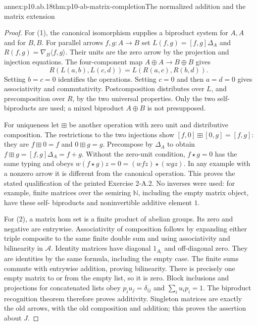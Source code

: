 \begin{annexitem}{annex:p10.ab.18}{thm:p10-ab-matrix-completion}{The normalized addition and the matrix extension}
\begin{proof}
For (1), the canonical isomorphism supplies a biproduct system for
\(A,A\) and for \(B,B\). For parallel arrows \(f,g:A\to B\)
set \(L(f,g)=[f,g]\Delta_A\) and
\(R(f,g)=\nabla_B\langle f,g\rangle\). Their units are the zero
arrow by the projection and injection equations. The four-component
map \(A\oplus A\to B\oplus B\) gives
\[
 R(L(a,b),L(c,d))=L(R(a,c),R(b,d)).
\]
Setting \(b=c=0\) identifies the operations. Setting \(c=0\)
and then \(a=d=0\) gives associativity and commutativity.
Postcomposition distributes over \(L\), and precomposition over
\(R\), by the two universal properties. Only the two self-biproducts
are used; a mixed biproduct \(A\oplus B\) is not presupposed.

For uniqueness let \(\boxplus\) be another operation with zero unit
and distributive composition. The restrictions to the two injections
show
\([f,0]\boxplus[0,g]=[f,g]\): they are \(f\boxplus0=f\)
and \(0\boxplus g=g\). Precompose by \(\Delta_A\) to obtain
\(f\boxplus g=[f,g]\Delta_A=f+g\). Without the zero-unit
condition, \(f\star g=0\) has the same typing and obeys
\(w(f\star g)z=0=(wfz)\star(wgz)\). In any example with a
nonzero arrow it is different from the canonical operation. This proves
the stated qualification of the printed Exercise 2-A.2.
No inverses were used: for example, finite matrices over the semiring
\(\mathbb N\), including the empty matrix object, have these self-
biproducts and noninvertible additive element \(1\).

For (2), a matrix hom set is a finite product of abelian groups.
Its zero and negative are entrywise. Associativity of composition
follows by expanding either triple composite to the same finite double
sum and using associativity and bilinearity in \(\mathcal A\).
Identity matrices have diagonal \(1_{A_i}\) and off-diagonal zero.
They are identities by the same formula, including the empty case.
The finite sums commute with entrywise addition, proving bilinearity.
There is precisely one empty matrix to or from the empty list, so it
is zero. Block inclusions and projections for concatenated lists obey
\(p_i u_j=\delta_{ij}\) and \(\sum_i u_i p_i=1\). The biproduct
recognition theorem therefore proves additivity. Singleton matrices
are exactly the old arrows, with the old composition and addition;
this proves the assertion about \(J\).


\end{proof}
\end{annexitem}
